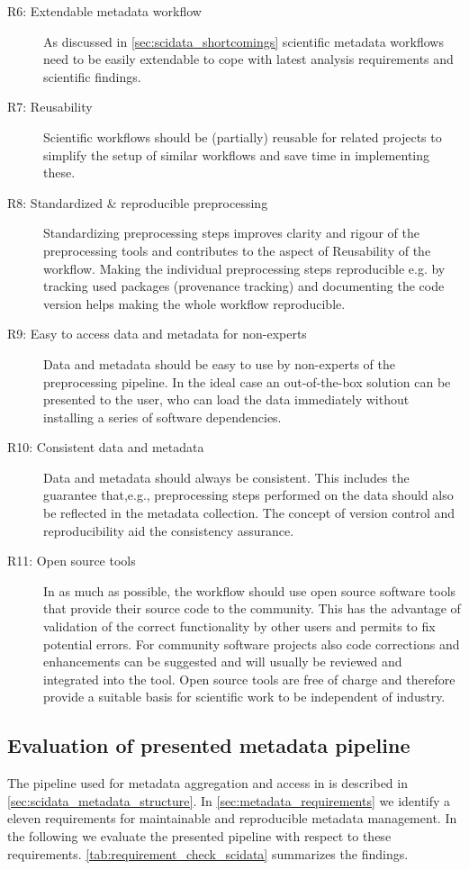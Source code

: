 \begin{description}
 \item[R6: Extendable metadata workflow] As discussed in \cref{sec:scidata_shortcomings} scientific metadata workflows need to be easily extendable to cope with latest analysis requirements and scientific findings.
 \item[R7: Reusability] Scientific workflows should be (partially) reusable for related projects to simplify the setup of similar workflows and save time in implementing these.
 \item[R8: Standardized \& reproducible preprocessing] Standardizing preprocessing steps improves clarity and rigour of the preprocessing tools and contributes to the aspect of Reusability of the workflow. Making the individual preprocessing steps reproducible e.g. by tracking used packages (provenance tracking) and documenting the code version helps making the whole workflow reproducible.
 \item[R9: Easy to access data and metadata for non-experts] Data and metadata should be easy to use by non-experts of the preprocessing pipeline. In the ideal case an out-of-the-box solution can be presented to the user, who can load the data immediately without installing a series of software dependencies. 
 \item[R10: Consistent data and metadata] Data and metadata should always be consistent. This includes the guarantee that,e.g., preprocessing steps performed on the data should also be reflected in the metadata collection. The concept of version control and reproducibility aid the consistency assurance.
 \item[R11: Open source tools] In as much as possible, the workflow should use open source software tools that provide their source code to the community. This has the advantage of validation of the correct functionality by other users and permits to fix potential errors. For community software projects also code corrections and enhancements can be suggested and will usually be reviewed and integrated into the tool. Open source tools are free of charge and therefore provide a suitable basis for scientific work to be independent of industry.
\end{description}


\subsection{Evaluation of presented metadata pipeline}
\label{sec:r2gpipeline_evaluation}
The pipeline used for metadata aggregation and access in \citet{Brochier_2018} is described in \cref{sec:scidata_metadata_structure}. In \cref{sec:metadata_requirements} we identify a eleven requirements for maintainable and reproducible metadata management. In the following we evaluate the presented pipeline with respect to these requirements. \cref{tab:requirement_check_scidata} summarizes the findings.
\newline

